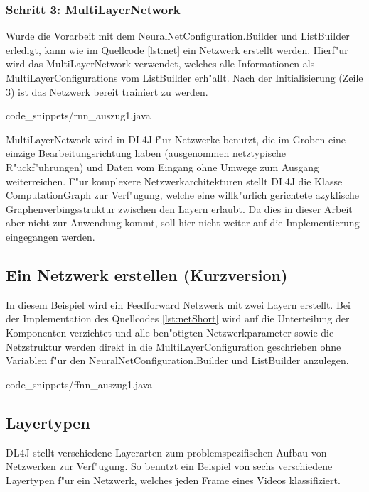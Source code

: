 {\subsubsection{Schritt 3: MultiLayerNetwork}
Wurde die Vorarbeit mit dem NeuralNetConfiguration.Builder und ListBuilder erledigt, kann wie im Quellcode \ref{lst:net} ein Netzwerk erstellt werden. Hierf"ur wird das MultiLayerNetwork verwendet, welches alle Informationen als MultiLayerConfigurations vom ListBuilder erh"allt. Nach der Initialisierung (Zeile 3) ist das Netzwerk bereit trainiert zu werden.

{code_snippets/rnn_auszug1.java}

MultiLayerNetwork wird in DL4J f"ur Netzwerke benutzt, die im Groben eine einzige Bearbeitungsrichtung haben (ausgenommen netztypische R"uckf"uhrungen) und Daten vom Eingang ohne Umwege zum Ausgang weiterreichen. F"ur komplexere Netzwerkarchitekturen stellt DL4J die Klasse ComputationGraph zur Verf"ugung, welche eine willk"urlich gerichtete azyklische Graphenverbingsstruktur zwischen den Layern erlaubt. Da dies in dieser Arbeit aber nicht zur Anwendung kommt, soll hier nicht weiter auf die Implementierung eingegangen werden.

\subsection{Ein Netzwerk erstellen (Kurzversion)}
In diesem Beispiel wird ein Feedforward Netzwerk mit zwei Layern erstellt. Bei der Implementation des Quellcodes \ref{lst:netShort} wird auf die Unterteilung der Komponenten verzichtet und alle ben"otigten Netzwerkparameter sowie die Netzstruktur werden direkt in die MultiLayerConfiguration geschrieben ohne Variablen f"ur den NeuralNetConfiguration.Builder und ListBuilder anzulegen.

{code_snippets/ffnn_auszug1.java}

\subsection{Layertypen}
DL4J stellt verschiedene Layerarten zum problemspezifischen Aufbau von Netzwerken zur Verf"ugung. So benutzt ein Beispiel von \cite{DL4J} sechs verschiedene Layertypen f"ur ein Netzwerk, welches jeden Frame eines Videos klassifiziert. 

}
